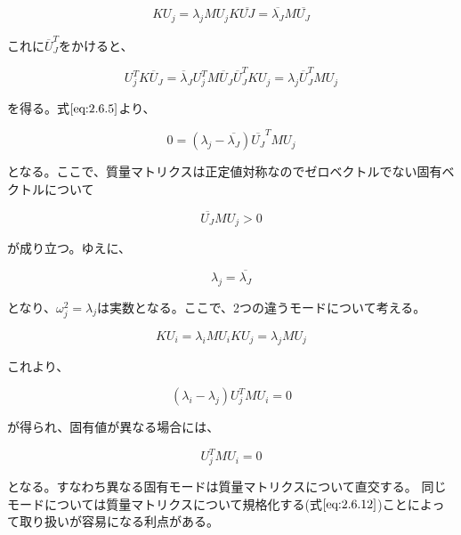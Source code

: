 \documentclass[a4paper,pandoc,ja=standard]{bxjsarticle}
\begin{document}
\begin{equation}
K U_j = \lambda_j M U_j
K \overline{UJ} = \overline{\lambda_J} M \overline{U_J}
\label{eq:2.6.4}
\end{equation}

これに\(\overline{U}_J^T\)をかけると、

\begin{equation}
U_j^T K \overline{U}_J = \overline{\lambda}_J
U_j^T M \overline{U}_J
\overline{U}_J^T K U_j = \lambda_j \overline{U}_J^T M U_j
\label{eq:2.6.5}
\end{equation}

を得る。式\(\eqref{eq:2.6.5}\)より、

\begin{equation}
0 = ( \lambda_j - \overline{\lambda_J} ) \overline{U_J}^T M U_j
\label{eq:2.6.6}
\end{equation}

となる。ここで、質量マトリクスは正定値対称なのでゼロベクトルでない固有ベクトルについて

\begin{equation}
\overline{U_J} M U_j > 0
\label{eq:2.6.7}
\end{equation}

が成り立つ。ゆえに、

\begin{equation}
\lambda_j =\overline{\lambda_J}
\label{eq:2.6.8}
\end{equation}

となり、\(\omega_j^2 = \lambda_j\)は実数となる。ここで、2つの違うモードについて考える。

\begin{equation}
K U_i = \lambda_i M U_i
K U_j = \lambda_j M U_j
\label{eq:2.6.9}
\end{equation}

これより、

\begin{equation}
( \lambda_i - \lambda_j ) U_j^T M U_i = 0
\label{eq:2.6.10}
\end{equation}

が得られ、固有値が異なる場合には、

\begin{equation}
U_j^T M U_i = 0
\label{eq:2.6.11}
\end{equation}

となる。すなわち異なる固有モードは質量マトリクスについて直交する。
同じモードについては質量マトリクスについて規格化する(式\(\eqref{eq:2.6.12}\))ことによって取り扱いが容易になる利点がある。
\end{document}
